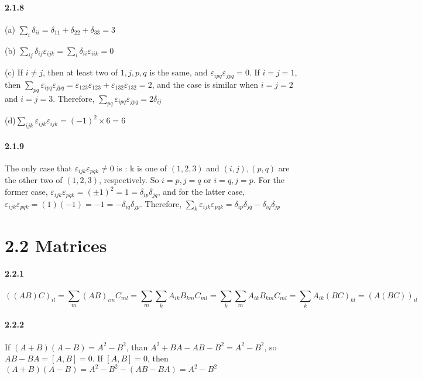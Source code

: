 \documentclass[a4paper]{article}
\begin{document}
\paragraph{2.1.8}
(a) $\sum_{i}\delta_{ii}=\delta_{11}+\delta_{22}+\delta_{33}=3$

(b) $\sum_{ij}\delta_{ij}\varepsilon_{ijk}=\sum_{i}\delta_{ii}\varepsilon_{iik}=0$

(c) If $i\neq j$, then at least two of $1,j,p,q$ is the same, and $\varepsilon_{ipq}\varepsilon_{jpq}=0$. If  $i=j=1$, then 
$\sum_{pq}\varepsilon_{ipq}\varepsilon_{jpq}=\varepsilon_{123}\varepsilon_{123}+\varepsilon_{132}\varepsilon_{132}=2$, and the case is similar when $i=j=2$ and $i=j=3$. Therefore, $\sum_{pq}\varepsilon_{ipq}\varepsilon_{jpq}=2\delta_{ij}$ 

(d)$\sum_{ijk}\varepsilon_{ijk}\varepsilon_{ijk}=(-1)^2\times6=6$

\paragraph{2.1.9}
The only case that $\varepsilon_{ijk}\varepsilon_{pqk}\neq0$ is : k is one of $(1,2,3)$ and $(i,j),(p,q)$ are the other two of $(1,2,3)$, respectively. So $i=p,j=q$ or $i=q,j=p$. For the former case, $\varepsilon_{ijk}\varepsilon_{pqk}=(\pm1)^2=1=\delta_{ip}\delta_{jq}$, and for the latter case, $\varepsilon_{ijk}\varepsilon_{pqk}=(1)(-1)=-1=-\delta_{iq}\delta_{jp}$. Therefore, $\sum_{k}\varepsilon_{ijk}\varepsilon_{pqk}=\delta_{ip}\delta_{jq}-\delta_{iq}\delta_{jp}$

\section*{2.2 Matrices}

\paragraph{2.2.1}
\[((AB)C)_{il}=\sum_m(AB)_{im}C_{ml}=\sum_m\sum_k A_{ik}B_{km}C_{ml}=\sum_k\sum_m A_{ik}B_{km}C_{ml}=\sum_k A_{ik}(BC)_{kl}=(A(BC))_{il}\]

\paragraph{2.2.2}
If $(A+B)(A-B)=A^2-B^2$, than $A^2+BA-AB-B^2=A^2-B^2$, so $AB-BA=[A,B]=0$. If $[A,B]=0$, then $(A+B)(A-B)=A^2-B^2-(AB-BA)=A^2-B^2$
\end{document}
